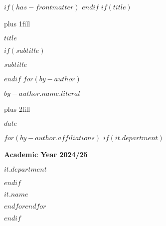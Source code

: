 $if(has-frontmatter)$
\frontmatter
$endif$
$if(title)$
\cleardoublepage
\thispagestyle{empty}
{\centering
\hbox{}\vskip 0cm plus 1fill
{\Huge\bfseries $title$ \par}
$if(subtitle)$
\vspace{3ex}
{\Large\bfseries $subtitle$ \par}
$endif$
\vspace{12ex}
$for(by-author)$
{\Large\bfseries $by-author.name.literal$ \par}
\vskip 0cm plus 2fill
{\bfseries\large $date$ \par}
\vspace{12ex}
$for(by-author.affiliations)$%
$if(it.department)$%
{\bfseries\large Academic Year 2024/25 \par}
\vspace{3ex}
{\bfseries\large $it.department$ \par}
\vspace{3ex}
$endif$%
{\bfseries\large $it.name$ \par}
$endfor$$endfor$%
}

$endif$
